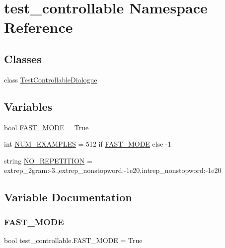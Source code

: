 \hypertarget{namespacetest__controllable}{}\section{test\+\_\+controllable Namespace Reference}
\label{namespacetest__controllable}
\subsection*{Classes}
\begin{DoxyCompactItemize}
\item 
class \hyperlink{classtest__controllable_1_1TestControllableDialogue}{Test\+Controllable\+Dialogue}
\end{DoxyCompactItemize}
\subsection*{Variables}
\begin{DoxyCompactItemize}
\item 
bool \hyperlink{namespacetest__controllable_ad2c8c083bae98c16daef9da4b2494618}{F\+A\+S\+T\+\_\+\+M\+O\+DE} = True
\item 
int \hyperlink{namespacetest__controllable_a7482064eb69e2d38391c4be1fc81e234}{N\+U\+M\+\_\+\+E\+X\+A\+M\+P\+L\+ES} = 512 if \hyperlink{namespacetest__controllable_ad2c8c083bae98c16daef9da4b2494618}{F\+A\+S\+T\+\_\+\+M\+O\+DE} else -\/1
\item 
string \hyperlink{namespacetest__controllable_aab6d0af3084ea9ec5a2deb23ae724eb3}{N\+O\+\_\+\+R\+E\+P\+E\+T\+I\+T\+I\+ON} = \textquotesingle{}extrep\+\_\+2gram\+:-\/3.,extrep\+\_\+nonstopword\+:-\/1e20,intrep\+\_\+nonstopword\+:-\/1e20\textquotesingle{}
\end{DoxyCompactItemize}


\subsection{Variable Documentation}
\mbox{\label{namespacetest__controllable_ad2c8c083bae98c16daef9da4b2494618}} 
\subsubsection{\texorpdfstring{F\+A\+S\+T\+\_\+\+M\+O\+DE}{FAST\_MODE}}
{\footnotesize\ttfamily bool test\+\_\+controllable.\+F\+A\+S\+T\+\_\+\+M\+O\+DE = True}



